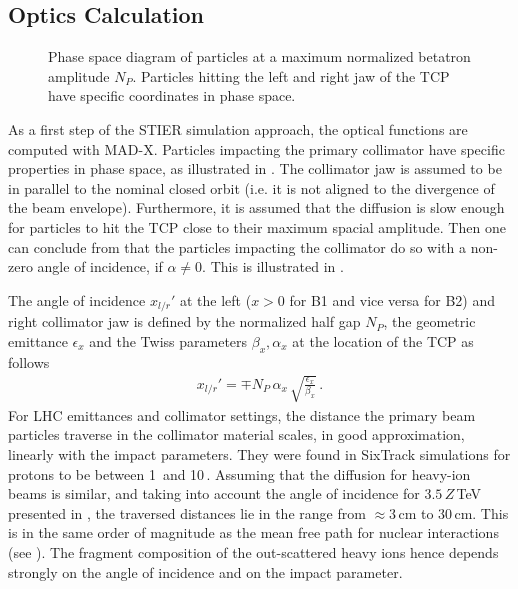 \subsection{Optics Calculation}
%
\begin{figure}[htpb]
  \centering
   \def\svgwidth{0.6\linewidth}
   
  \caption{Phase space diagram of particles at a maximum normalized betatron amplitude $N_P$. Particles hitting the left and right jaw of the TCP have specific coordinates in phase space.}
  \label{pic:14070304}
\end{figure}
%
As a first step of the STIER simulation approach, the optical functions are computed with MAD-X. Particles impacting the primary collimator have specific properties in phase space, as illustrated in . The collimator jaw is assumed to be in parallel to the nominal closed orbit (i.e. it is not aligned to the divergence of the beam envelope). Furthermore, it is assumed that the diffusion is slow enough for particles to hit the TCP close to their maximum spacial amplitude. Then one can conclude from  that the particles impacting the collimator do so with a non-zero angle of incidence, if $\alpha \neq 0$. This is illustrated in . 

The angle of incidence $x_{l/r}'$ at the left ($x>0$ for B1 and vice versa for B2) and right collimator jaw is defined by the normalized half gap $N_P$, the geometric emittance $\epsilon_x$ and the Twiss parameters $\beta_x,\alpha_x$ at the location of the TCP as follows~\cite{wiedemann1999particle}
\begin{align}
x_{l/r}' = \mp N_P \, \alpha_x \, \sqrt{\frac{\epsilon_x}{\beta_x}} \, . \label{eq:angle_of_incidence}
\end{align}
%
For LHC emittances and collimator settings, the distance the primary beam particles traverse in the collimator material scales, in good approximation, linearly with the impact parameters. They were found in SixTrack simulations for protons to be between 1\mum\, and 10\mum\,\cite{Bruce2014a}.  Assuming that the diffusion for heavy-ion beams is similar, and taking into account the angle of incidence for $3.5\,Z\,$TeV presented in , the traversed distances lie in the range from $\approx 3\,$cm to $30\,$cm. This is in the same order of magnitude as the mean free path for nuclear interactions (see ). The fragment composition of the out-scattered heavy ions hence depends strongly on the angle of incidence and on the impact parameter.


